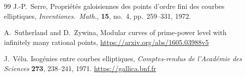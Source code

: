 \documentclass{amsart}
\begin{document}
\begin{thebibliography}{99}
  J.-P.~Serre, Propri\'et\'es galoisiennes des points d'ordre fini des courbes elliptiques,
  {\it Inventiones.~Math.}, {\bf 15}, no.~4, pp.~259--331, 1972.

  A.~Sutherland and D.~Zywina,
  Modular curves of prime-power level with infinitely many rational points,
  \url{https://arxiv.org/abs/1605.03988v5}

  J.~V\'elu.
  Isog\'enies entre courbes elliptiques,
  {\it Comptes-rendus de l'Acad\'emie des Sciences} {\bf 273}, 238--241, 1971.
  \url{https://gallica.bnf.fr}

\end{thebibliography}
\end{document}
